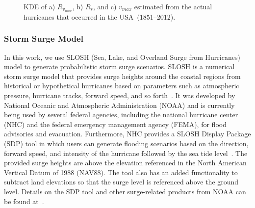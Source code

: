 \begin{figure}[ht]
    \centering
    \begin{subfigure}[t]{0.55\textwidth}
        \centering
        \caption{}
    \end{subfigure}%
    \hspace*{\fill}
    \begin{subfigure}[t]{0.55\textwidth}
        \centering
        \caption{}
    \end{subfigure}
    \bigskip
    \hspace*{\fill}
    \begin{subfigure}[t]{0.55\textwidth}
        \centering
        \caption{}
    \end{subfigure}
    \hspace*{\fill}
    \vspace{-10pt}
    \caption{KDE of a) $R_{v_{max}}$, b) $R_s$, and c) $v_{max}$ estimated from the actual hurricanes that occurred in the USA~(1851--2012).} 
    \label{fig:three graphs}
\end{figure}

\subsubsection{Storm Surge Model}
In this work, we use SLOSH (Sea, Lake, and Overland Surge from Hurricanes) model to generate probabilistic storm surge scenarios. SLOSH is a numerical storm surge model that provides surge heights around the coastal regions from historical or hypothetical hurricanes based on parameters such as atmospheric pressure, hurricane tracks, forward speed, and so forth~\cite{glahn2009role}. It was developed by National Oceanic and Atmospheric Administration (NOAA) and is currently being used by several federal agencies, including the national hurricane center (NHC) and the federal emergency management agency (FEMA), for flood advisories and evacuation. Furthermore, NHC provides a SLOSH Display Package (SDP) tool in which users can generate flooding scenarios based on the direction, forward speed, and intensity of the hurricane followed by the sea tide level~\cite{SDP}. The provided surge heights are above the elevation referenced in the North American Vertical Datum of 1988 (NAV88). The tool also has an added functionality to subtract land elevations so that the surge level is referenced above the ground level. Details on the SDP tool and other surge-related products from NOAA can be found at~\cite{SDP}. 

